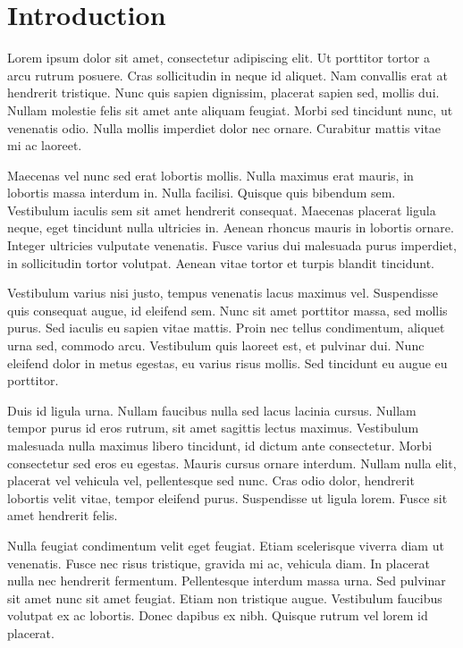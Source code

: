 
\section{Introduction} %
\label{sec:introduction}

Lorem ipsum dolor sit amet, consectetur adipiscing elit. Ut porttitor tortor a arcu rutrum posuere. Cras sollicitudin in neque id aliquet. Nam convallis erat at hendrerit tristique. Nunc quis sapien dignissim, placerat sapien sed, mollis dui. Nullam molestie felis sit amet ante aliquam feugiat. Morbi sed tincidunt nunc, ut venenatis odio. Nulla mollis imperdiet dolor nec ornare. Curabitur mattis vitae mi ac laoreet.

Maecenas vel nunc sed erat lobortis mollis. Nulla maximus erat mauris, in lobortis massa interdum in. Nulla facilisi. Quisque quis bibendum sem. Vestibulum iaculis sem sit amet hendrerit consequat. Maecenas placerat ligula neque, eget tincidunt nulla ultricies in. Aenean rhoncus mauris in lobortis ornare. Integer ultricies vulputate venenatis. Fusce varius dui malesuada purus imperdiet, in sollicitudin tortor volutpat. Aenean vitae tortor et turpis blandit tincidunt.

Vestibulum varius nisi justo, tempus venenatis lacus maximus vel. Suspendisse quis consequat augue, id eleifend sem. Nunc sit amet porttitor massa, sed mollis purus. Sed iaculis eu sapien vitae mattis. Proin nec tellus condimentum, aliquet urna sed, commodo arcu. Vestibulum quis laoreet est, et pulvinar dui. Nunc eleifend dolor in metus egestas, eu varius risus mollis. Sed tincidunt eu augue eu porttitor.

Duis id ligula urna. Nullam faucibus nulla sed lacus lacinia cursus. Nullam tempor purus id eros rutrum, sit amet sagittis lectus maximus. Vestibulum malesuada nulla maximus libero tincidunt, id dictum ante consectetur. Morbi consectetur sed eros eu egestas. Mauris cursus ornare interdum. Nullam nulla elit, placerat vel vehicula vel, pellentesque sed nunc. Cras odio dolor, hendrerit lobortis velit vitae, tempor eleifend purus. Suspendisse ut ligula lorem. Fusce sit amet hendrerit felis.

Nulla feugiat condimentum velit eget feugiat. Etiam scelerisque viverra diam ut venenatis. Fusce nec risus tristique, gravida mi ac, vehicula diam. In placerat nulla nec hendrerit fermentum. Pellentesque interdum massa urna. Sed pulvinar sit amet nunc sit amet feugiat. Etiam non tristique augue. Vestibulum faucibus volutpat ex ac lobortis. Donec dapibus ex nibh. Quisque rutrum vel lorem id placerat.


